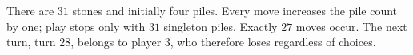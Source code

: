 There are $31$ stones and initially four piles. Every move increases the pile count by one; play stops only with $31$ singleton piles. Exactly $27$ moves occur. The next turn, turn $28$, belongs to player $3$, who therefore loses regardless of choices.
